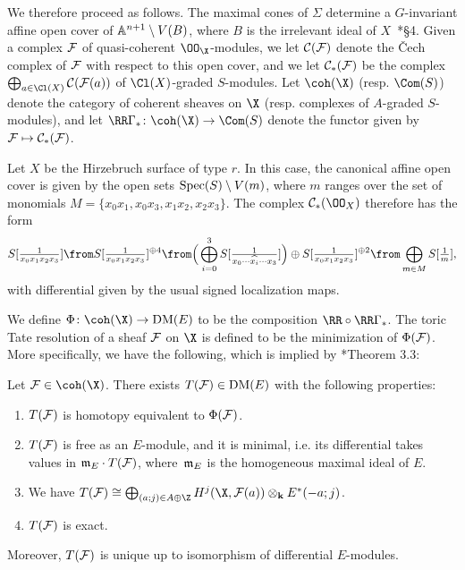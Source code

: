 \documentclass{amsart}
\begin{document}
We therefore proceed as follows. The maximal cones of $\Sigma$ determine a $G$-invariant affine open cover of $\AA^{n+1} \setminus V(B)$, where $B$ is the irrelevant ideal of $X$~\cite{BCS05}*{\S 4}. Given a complex $\F$ of quasi-coherent $\OO_\X$-modules, we let $\cC(\F)$ denote the \v{C}ech complex of $\F$ with respect to this open cover, and we let $\cC_*(\F)$ be the complex $\bigoplus_{a \in \Cl(X)} \cC(\F(a))$ of $\Cl(X)$-graded $S$-modules. Let $\coh(\X)$ (resp. $\Com(S)$) denote the category of coherent sheaves on $\X$ (resp. complexes of $A$-graded $S$-modules), and let $\RR\Gamma_* \co \coh(\X) \to \Com(S)$ denote the functor given by $\F \mapsto \cC_*(\F)$.

\begin{example}
\label{ex:cech}
Let $X$ be the Hirzebruch surface of type $r$. In this case, the canonical affine open cover is given by
the open sets $\Spec(S) \setminus V(m)$, where $m$ ranges over the set of monomials $M = \{x_0x_1, x_0x_3, x_1x_2, x_2x_3\}$. The complex $\cC_*(\OO_X)$ therefore has the form
$$
S[\tfrac{1}{x_0x_1x_2x_3}]
\from
S[\tfrac{1}{x_0x_1x_2x_3}]^{\oplus 4}
\from
\Big(\bigoplus_{i = 0}^3 S[\tfrac{1}{x_0 \cdots \widehat{x_i} \cdots x_3}]\Big)
\oplus S[\tfrac{1}{x_0x_1x_2x_3}]^{\oplus 2}
\from
\bigoplus_{m \in M} S[\tfrac{1}{m}],
$$
with differential given by the usual signed localization maps.
\end{example}

We define $\Phi \co \coh(\X) \to \DM(E)$ to be the composition $\RR \circ \RR\Gamma_*$. The toric Tate resolution of a sheaf $\F$ on $\X$ is defined to be the minimization of $\Phi(\F)$. More specifically, we have the following, which is implied by \cite{BE24b}*{Theorem 3.3}:

\begin{thm}
\label{thm:tate2}
Let $\F \in \coh(\X)$. There exists $T(\F) \in \DM(E)$ with the following properties:
\begin{enumerate}
\item $T(\F)$ is homotopy equivalent to $\Phi(\F)$.
\item $T(\F)$ is free as an $E$-module, and it is minimal, i.e. its differential takes values in $\m_E \cdot T(\F)$, where~$\m_E$ is the homogeneous maximal ideal of $E$.
\item We have $T(\F) \cong \bigoplus_{(a;j) \in A \oplus \Z} H^j(\X, \F(a)) \otimes_\k E^*(-a;j)$.
\item $T(\F)$ is exact.
\end{enumerate}
Moreover, $T(\F)$ is unique up to isomorphism of differential $E$-modules.
\end{thm}
\end{document}
